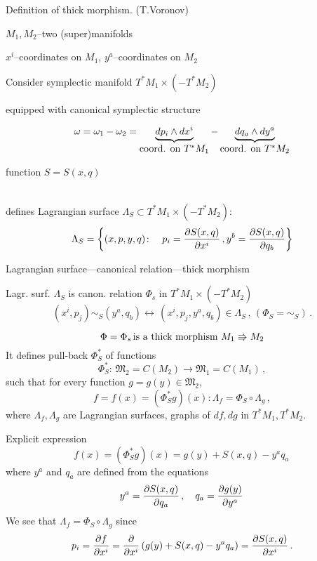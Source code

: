 \documentclass{beamer}
\def\w {{\omega}}
\def\p{\partial}
\def\L {{\Lambda}}
\def\M {{\mathfrak M}}
\def\p {\partial}
\begin{document}
\begin{frame}{Definition of thick morphism. (T.Voronov)}
\centerline  {$M_1,M_2$--two (super)manifolds}

 $x^i$--coordinates on $M_1$, $y^a$--coordinates on $M_2$\\
\medskip

   \centerline {Consider symplectic manifold $T^*M_1\times (-T^*M_2)$}
   \centerline {equipped with canonical symplectic structure }
                $$
   \w=\w_1-\w_2=\underbrace{dp_i\wedge dx^i}_
        {\hbox{coord. on $T^*M_1$}}-
        \underbrace{dq_a\wedge dy^a}_
        {\hbox{coord. on $T^*M_2$}}
                $$
    \centerline {function $S=S(x,q)$} \\defines Lagrangian surface  
$\L_S\subset T^*M_1\times (-T^*M_2)$:
           $$
  \L_S=\left\{(x,p,y,q)\colon\quad 
                     p_i={\p S(x,q)\over \p x^i}\,,
                     y^b={\p S(x,q)\over \p q_b}\right\}
           $$
   
\end{frame}
\begin{frame}{Lagrangian surface---canonical relation---thick morphism}

     Lagr. surf. $\L_S$ is canon. relation
  $\Phi_s$ in $T^*M_1\times (-T^*M_2)$
         $$
(x^i,p_j)\sim_S (y^a,q_b)\leftrightarrow\,
 (x^i,p_j,y^a,q_b)\in \L_S\,,\, (\Phi_S=\sim_S)\,.
         $$
        
                     $$
 \Phi=\Phi_s \,\hbox{is a thick morphism}\,\,     
   M_1\Rrightarrow M_2
                     $$
   It defines pull-back $\Phi_S^*$ of functions
                   $$
\Phi_S^*\colon \, \M_2=C(M_2)\rightarrow \M_1=C(M_1)\,,
                   $$
such that for every function $g=g(y)\in \M_2$,
                   $$
f=f(x)=(\Phi_S^* g)(x)\colon \L_f=\Phi_S\circ \L_g\,,
                   $$
where $\L_f, \L_g$ are Lagrangian surfaces, graphs of
$df,dg$ in $T^*M_1, T^*M_2$.
 
\end{frame}
\begin{frame}{Explicit expression}
      $$
f(x)=(\Phi_S^* g)(x)=g(y)+S(x,q)-y^aq_a\,
      $$ 
where $y^a$ and $q_a$ are defined from the equations
             $$
      y^a={\p S(x,q)\over \p q_a}\,,\quad
      q_a={\p g(y)\over \p y^a}\,
             $$
  We see that $\L_f=\Phi_S\circ \L_g$ since
       $$
p_i={\p f\over \p x^i}=
{\p\over \p x^i}
 \left(g(y)+S(x,q)-y^aq_a\right)={\p S(x,q)\over \p x^i}\,.
       $$
\end{frame}
\end{document}
